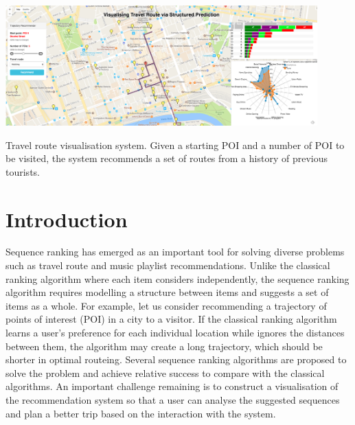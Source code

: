\documentclass[sigconf]{acmart}
\begin{document}


 \begin{teaserfigure}
 \centering
   \includegraphics[width=0.9\textwidth]{figure/sample_map.png}
   \caption{Travel route visualisation system. Given a starting POI and a number of POI to be visited, the system recommends a set of routes from a history of previous tourists.}
   \label{fig:overview}
 \end{teaserfigure}

\maketitle


\section{Introduction}
Sequence ranking has emerged as an important tool for solving diverse problems such as travel route and music playlist recommendations. Unlike the classical ranking algorithm where each item considers independently, the sequence ranking algorithm requires modelling a structure between items and suggests a set of items as a whole. For example, let us consider recommending a trajectory of points of interest (POI) in a city to a visitor. If the classical ranking algorithm learns a user's preference for each individual location while ignores the distances between them, the algorithm may create a long trajectory, which should be shorter in optimal routeing. Several sequence ranking algorithms are proposed to solve the problem and achieve relative success to compare with the classical algorithms. An important challenge remaining is to construct a visualisation of the recommendation system so that a user can analyse the suggested sequences and plan a better trip based on the interaction with the system.
\end{document}
